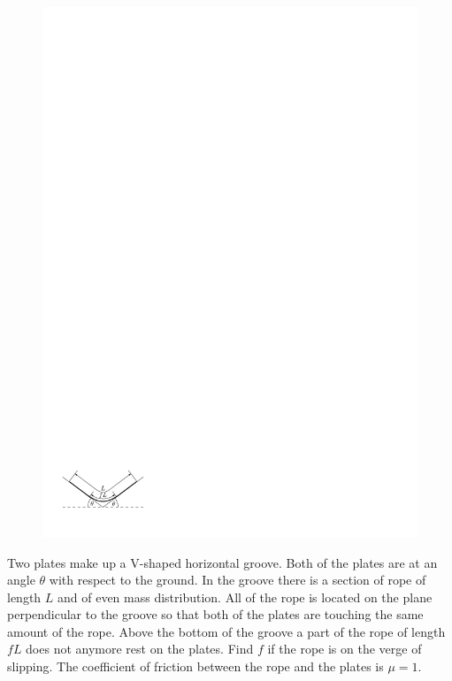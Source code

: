 \documentclass[11pt]{article}
\begin{document}

\probeng
\begin{figure}
\includegraphics[width=\linewidth]{2012-lahg-09-n88r_ipe}
\end{figure}
Two plates make up a V-shaped horizontal groove. Both of the plates are at an angle $\theta$ with respect to the ground. In the groove there is a section of rope of length $L$ and of even mass distribution. All of the rope is located on the plane perpendicular to the groove so that both of the plates are touching the same amount of the rope. Above the bottom of the groove a part of the rope of length $fL$ does not anymore rest on the plates. Find $f$ if the rope is on the verge of slipping. The coefficient of friction between the rope and the plates is $\mu = 1$.
\probend
\bigskip
\end{document}
